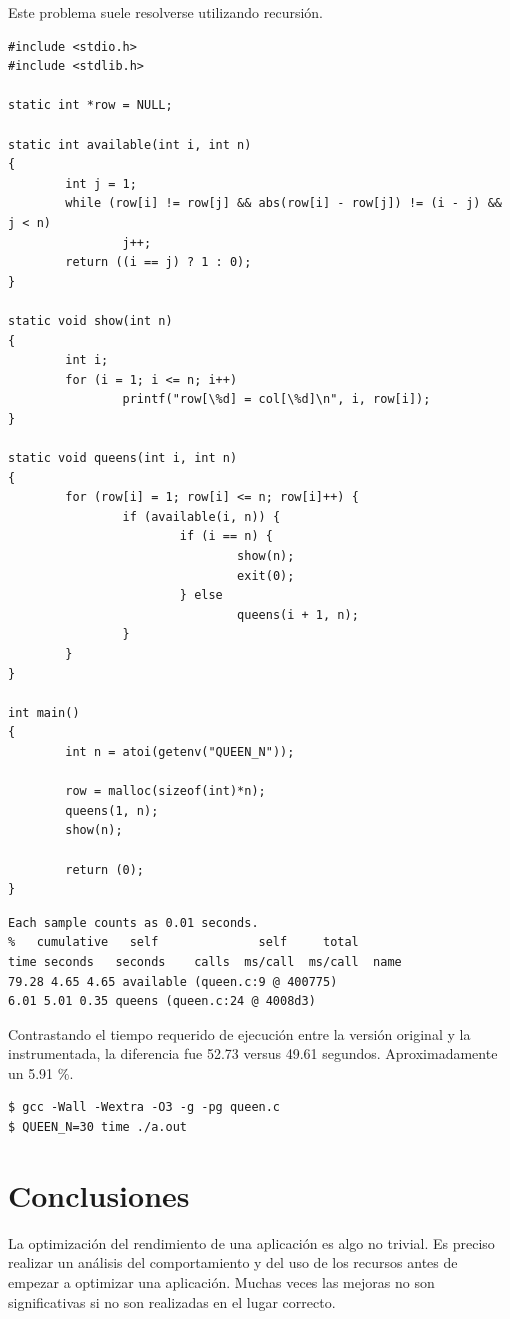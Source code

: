 \documentclass[a4paper]{report}
\begin{document}
Este problema suele resolverse utilizando recursión.

\begin{lstlisting}
#include <stdio.h>
#include <stdlib.h>

static int *row = NULL;

static int available(int i, int n)
{
        int j = 1;
        while (row[i] != row[j] && abs(row[i] - row[j]) != (i - j) && j < n)
                j++;
        return ((i == j) ? 1 : 0);
}

static void show(int n)
{
        int i;
        for (i = 1; i <= n; i++)
                printf("row[\%d] = col[\%d]\n", i, row[i]);
}

static void queens(int i, int n)
{
        for (row[i] = 1; row[i] <= n; row[i]++) {
                if (available(i, n)) {
                        if (i == n) {
                                show(n);
                                exit(0);
                        } else
                                queens(i + 1, n);
                }
        }
}

int main()
{
        int n = atoi(getenv("QUEEN_N"));

        row = malloc(sizeof(int)*n);
        queens(1, n);
        show(n);

        return (0);
}
\end{lstlisting}

\begin{lstlisting}
Each sample counts as 0.01 seconds.
%   cumulative   self              self     total
time seconds   seconds    calls  ms/call  ms/call  name
79.28 4.65 4.65 available (queen.c:9 @ 400775)
6.01 5.01 0.35 queens (queen.c:24 @ 4008d3)
\end{lstlisting}

Contrastando el tiempo requerido de ejecución entre la versión original y la instrumentada, la diferencia fue 52.73 versus 49.61 segundos. Aproximadamente un 5.91 \%.

\begin{lstlisting}
$ gcc -Wall -Wextra -O3 -g -pg queen.c
$ QUEEN_N=30 time ./a.out
\end{lstlisting}

\chapter{Conclusiones}\label{chapter:conclusions}

La optimización del rendimiento de una aplicación es algo no trivial.
Es preciso realizar un análisis del comportamiento y del uso de los recursos antes de
empezar a optimizar una aplicación. Muchas veces las mejoras no son significativas si no son realizadas en el lugar correcto.
\end{document}
